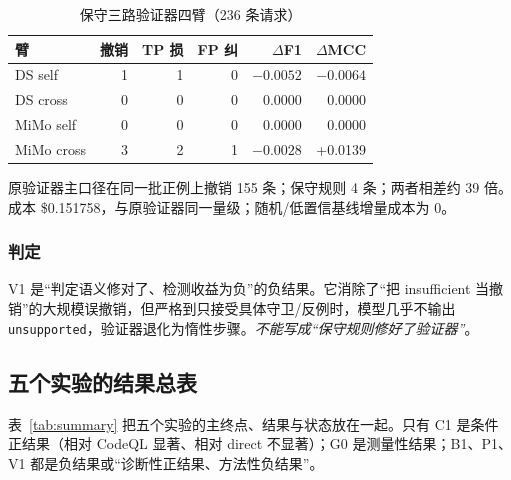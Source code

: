 \documentclass[conference]{IEEEtran}
\begin{document}
\begin{table}[t]
\centering
\caption{保守三路验证器四臂（236 条请求）}
\label{tab:conservative}
\footnotesize
\setlength{\tabcolsep}{2.6pt}
\begin{tabular}{@{}lrrrrr@{}}
\toprule
臂 & 撤销 & TP 损 & FP 纠 & $\Delta$F1 & $\Delta$MCC \\
\midrule
DS self & 1 & 1 & 0 & $-0.0052$ & $-0.0064$ \\
DS cross & 0 & 0 & 0 & 0.0000 & 0.0000 \\
MiMo self & 0 & 0 & 0 & 0.0000 & 0.0000 \\
MiMo cross & 3 & 2 & 1 & $-0.0028$ & +0.0139 \\
\bottomrule
\end{tabular}
\end{table}

原验证器主口径在同一批正例上撤销 155 条；保守规则 4 条；两者相差约 39 倍。成本 \$0.151758，与原验证器同一量级；随机/低置信基线增量成本为 0。

\subsubsection{判定}

V1 是“判定语义修对了、检测收益为负”的负结果。它消除了“把 insufficient 当撤销”的大规模误撤销，但严格到只接受具体守卫/反例时，模型几乎不输出 \texttt{unsupported}，验证器退化为惰性步骤。\emph{不能写成“保守规则修好了验证器”}。

\subsection{五个实验的结果总表}

表~\ref{tab:summary} 把五个实验的主终点、结果与状态放在一起。只有 C1 是条件正结果（相对 CodeQL 显著、相对 direct 不显著）；G0 是测量性结果；B1、P1、V1 都是负结果或“诊断性正结果、方法性负结果”。
\end{document}
